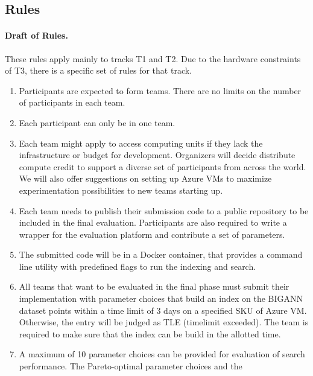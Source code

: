 \subsection{Rules}



\paragraph{Draft of Rules.} 

These rules apply mainly to tracks T1 and T2. 
Due to the hardware constraints of T3, there is a specific set of rules for that track.

\begin{enumerate}
  \item Participants are expected to form teams.  There are no limits
    on the number of participants in each team. %
\item Each participant can only be in one team.
\item Each team might apply to access computing units if they lack the
  infrastructure or budget for development. Organizers will decide
  distribute compute credit to support a diverse set of participants
  from across the world. We will also offer suggestions on setting up
  Azure VMs to maximize experimentation possibilities to new teams
  starting up.
\item Each team needs to publish their submission code to a public
  repository to be included in the final evaluation.  Participants are
  also required to write a wrapper for the evaluation platform and
  contribute a set of parameters.
  \item The submitted code will be in a Docker container, that provides a
    command line utility with predefined flags to run the indexing and
    search.
  \item All teams that want to be evaluated in the final phase must
    submit their implementation with parameter choices that build an
    index on the BIGANN dataset points within a time limit of 3
    days on a specified SKU of Azure VM. Otherwise, the entry will be judged as TLE (timelimit
    exceeded). The team is required to make sure that the index can
    be build in the allotted time.
\item A maximum of 10 parameter choices can be provided for evaluation
  of search performance. The Pareto-optimal parameter choices and the

\end{enumerate}

